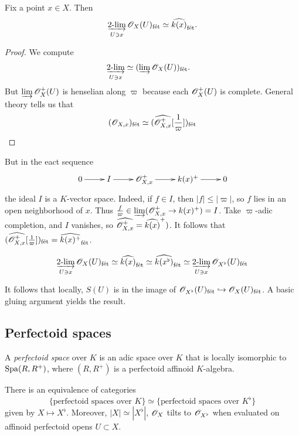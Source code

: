 \begin{lemma}
Fix a point $x\in X$. Then 
\[
  \twolim_{U\ni x} \sO_X(U)_\fet \simeq \widehat{k(x)}_\fet .
\]
\end{lemma}
\begin{proof}
We compute 
\begin{align*}
  \twolim_{U\ni x} &\simeq (\varinjlim \sO_X(U))_\fet .
\end{align*}
But $\varinjlim \mathscr{O}_X^+(U)$ is henselian along $\varpi$ because each 
$\mathscr{O}_X^+(U)$ is complete. General theory tells us that 
\[
  (\mathscr{O}_{X,x})_{\textnormal{f\'et}} \simeq (\widehat{\mathscr{O}_{X,x}^+}[\frac 1 \varpi])_{\textnormal{f\'et}}
\]
\end{proof}
But in the eact sequence 
\[\xymatrix{
  0 \ar[r] 
    & I \ar[r] 
    & \sO_{X,x}^+ \ar[r] 
    & k(x)^+ \ar[r] 
    & 0 
}\]
the ideal $I$ is a $K$-vector space. Indeed, if $f\in I$, then $|f|\leqslant |\varpi|$, 
so $f$ lies in an open neighborhood of $x$. Thus 
$\frac f \varpi \in \varinjlim(\mathscr{O}_{X,x}^+ \to k(x)^+) = I$. Take $\varpi$-adic 
completion, and $I$ vanishes, so $\widehat{\mathscr{O}_{X,x}^+} = \widehat{k(x)}^+)$. It 
follows that $(\widehat{\mathscr{O}_{X,x}^+}[\frac 1 \varpi])_{\textnormal{f\'et}} = \widehat{k(x)^+}_{\textnormal{f\'et}}$. 

\begin{corollary}
\[
  \twolim_{U\ni x} \sO_X(U)_\fet \simeq \widehat{k(x)}_\fet \simeq \widehat{k(x^\flat)}_\fet \simeq \twolim_{U\ni x} \sO_{X^\flat}(U)_\fet 
\]
\end{corollary}

It follows that locally, $S(U)$ is in the image of $\mathscr{O}_{X^\flat}(U)_{\textnormal{f\'et}}\hookrightarrow \mathscr{O}_X(U)_{\textnormal{f\'et}}$. A basic gluing argument yields the result. 






\subsection{Perfectoid spaces}

\begin{definition}
A \emph{perfectoid space} over $K$ is an adic space over $K$ that is locally isomorphic 
to $\operatorname{Spa}(R,R^+)$, where $(R,R^+)$ is a perfectoid affinoid $K$-algebra. 
\end{definition}

\begin{corollary}
There is an equivalence of categories 
\[
  \{\text{perfectoid spaces over }K\} \simeq \{\text{perfectoid spaces over $K^\flat$}\} 
\]
given by $X\mapsto X^\flat$. Moreover, $|X|\simeq |X^\flat|$, 
$\mathscr{O}_X$ tilts to $\mathscr{O}_{X^\flat}$ when evaluated on affinoid perfectoid opens 
$U\subset X$. 
\end{corollary}

